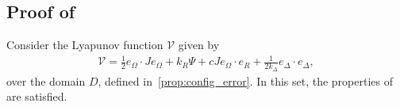 \subsection{Proof of~}\label{proof:adaptive_control}
Consider the Lyapunov function \( \mathcal{V} \) given by
\begin{align*}
	\mathcal{V} = \frac{1}{2} e_\Omega \cdot J e_\Omega + k_R \Psi + c J e_\Omega \cdot e_R + \frac{1}{2 k_\Delta} e_\Delta \cdot e_\Delta , %
\end{align*}
over the domain \( D \), defined in~\cref{prop:config_error}. 
In this set, the properties of~ are satisfied.

